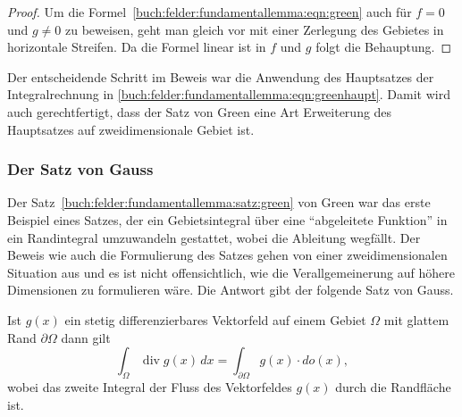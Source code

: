 \begin{proof}
Um die Formel~\eqref{buch:felder:fundamentallemma:eqn:green} auch
für $f=0$ und $g\ne 0$ zu beweisen, geht man gleich vor mit 
einer Zerlegung des Gebietes in horizontale Streifen.
Da die Formel linear ist in $f$ und $g$ folgt die Behauptung.
\end{proof}

Der entscheidende Schritt im Beweis war die Anwendung des Hauptsatzes
der Integralrechnung in
\eqref{buch:felder:fundamentallemma:eqn:greenhaupt}.
Damit wird auch gerechtfertigt, dass der Satz von Green eine Art
Erweiterung des Hauptsatzes auf zweidimensionale Gebiet ist.

%
%
\subsubsection{Der Satz von Gauss}
Der Satz~\ref{buch:felder:fundamentallemma:satz:green} von Green
war das erste Beispiel eines Satzes, der ein Gebietsintegral über eine
``abgeleitete Funktion'' in ein Randintegral umzuwandeln gestattet, wobei
die Ableitung wegfällt.
Der Beweis wie auch die Formulierung des Satzes gehen von einer
zweidimensionalen Situation aus und es ist nicht offensichtlich,
wie die Verallgemeinerung auf höhere Dimensionen zu formulieren wäre.
Die Antwort gibt der folgende Satz von Gauss.

\begin{satz}[Gauss]
\label{buch:felder:fundamentallemma:satz:gauss}
Ist $g(x)$ ein stetig differenzierbares Vektorfeld auf einem Gebiet
$\Omega$ mit glattem Rand $\partial\Omega$ dann gilt
\begin{equation}
\int_\Omega \operatorname{div}g(x)\,dx
=
\int_{\partial\Omega} g(x)\cdot do(x),
\label{buch:felder:fundamentallemma:eqn:gauss}
\end{equation}
wobei das zweite Integral der Fluss des Vektorfeldes $g(x)$ durch
die Randfläche ist.
\end{satz}

